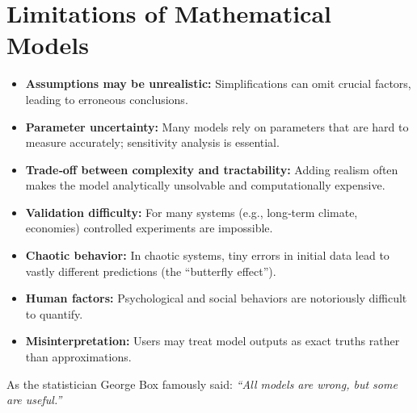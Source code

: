 \documentclass[12pt,a4paper]{book}
\begin{document}
\section{Limitations of Mathematical Models}
\begin{itemize}[leftmargin=*]
    \item \textbf{Assumptions may be unrealistic:} Simplifications can omit crucial factors, leading to erroneous conclusions.
    \item \textbf{Parameter uncertainty:} Many models rely on parameters that are hard to measure accurately; sensitivity analysis is essential.
    \item \textbf{Trade‑off between complexity and tractability:} Adding realism often makes the model analytically unsolvable and computationally expensive.
    \item \textbf{Validation difficulty:} For many systems (e.g., long‑term climate, economies) controlled experiments are impossible.
    \item \textbf{Chaotic behavior:} In chaotic systems, tiny errors in initial data lead to vastly different predictions (the ``butterfly effect'').
    \item \textbf{Human factors:} Psychological and social behaviors are notoriously difficult to quantify.
    \item \textbf{Misinterpretation:} Users may treat model outputs as exact truths rather than approximations.
\end{itemize}
As the statistician George Box famously said: \textit{“All models are wrong, but some are useful.”}
\end{document}
